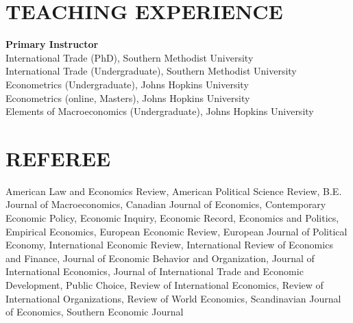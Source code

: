 \documentclass[11pt]{res}
\begin{document}
\begin{resume}
\section{TEACHING EXPERIENCE} \vspace{1.5mm}
{\bf Primary Instructor}\vspace{1.5mm}\\
International Trade (PhD), Southern Methodist University\vspace{1.5mm}\\
International Trade (Undergraduate), Southern Methodist University\vspace{1.5mm}\\
Econometrics (Undergraduate), Johns Hopkins University\vspace{1.5mm}\\
Econometrics (online, Masters), Johns Hopkins University\vspace{1.5mm}\\
Elements of Macroeconomics (Undergraduate), Johns Hopkins University\vspace{1.5mm}\\

\section{REFEREE} \vspace{1.5mm}
American Law and Economics Review, American Political Science Review, B.E. Journal of Macroeconomics, Canadian Journal of Economics, Contemporary Economic Policy, Economic Inquiry, 
Economic Record, Economics and Politics, Empirical Economics, European Economic Review, European Journal of Political Economy, International Economic Review, International Review of Economics and Finance, Journal of Economic Behavior and Organization, Journal of International Economics, Journal of International Trade and Economic Development, Public Choice, Review of International Economics, Review of International Organizations, Review of World Economics, Scandinavian Journal of Economics, Southern Economic Journal
\end{resume}
\end{document}
